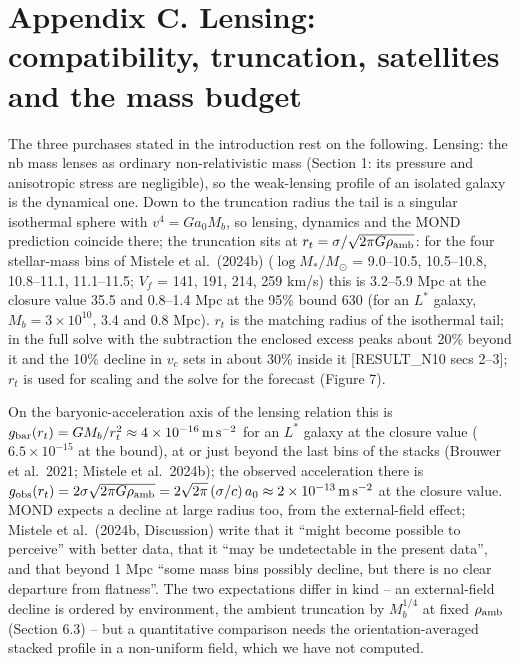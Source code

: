 \documentclass[
  10pt,
]{article}
\begin{document}
\section{Appendix C. Lensing: compatibility, truncation, satellites and the mass budget}\label{appendix-c.-lensing-compatibility-truncation-satellites-and-the-mass-budget}

The three purchases stated in the introduction rest on the following. Lensing: the nb mass lenses as ordinary non-relativistic mass (Section 1: its pressure and anisotropic stress are negligible), so the weak-lensing profile of an isolated galaxy is the dynamical one. Down to the truncation radius the tail is a singular isothermal sphere with $v^4=G a_0 M_b$, so lensing, dynamics and the MOND prediction coincide there; the truncation sits at $r_t=\sigma/\sqrt{2\pi G\rho_{\rm amb}}$: for the four stellar-mass bins of Mistele et al.~(2024b) ($\log M_*/M_\odot$ = 9.0--10.5, 10.5--10.8, 10.8--11.1, 11.1--11.5; $V_f$ = 141, 191, 214, 259 km/s) this is 3.2--5.9 Mpc at the closure value 35.5 and 0.8--1.4 Mpc at the 95\% bound 630 (for an $L^*$ galaxy, $M_b=3\times10^{10}$, 3.4 and 0.8 Mpc). $r_t$ is the matching radius of the isothermal tail; in the full solve with the subtraction the enclosed excess peaks about 20\% beyond it and the 10\% decline in $v_c$ sets in about 30\% inside it {[}RESULT\_N10 secs 2--3{]}; $r_t$ is used for scaling and the solve for the forecast (Figure 7).

On the baryonic-acceleration axis of the lensing relation this is $g_{\rm bar}(r_t)=GM_b/r_t^2\approx 4\times10^{-16}\,{\rm m\,s^{-2}}$ for an $L^*$ galaxy at the closure value ($6.5\times10^{-15}$ at the bound), at or just beyond the last bins of the stacks (Brouwer et al.~2021; Mistele et al.~2024b); the observed acceleration there is $g_{\rm obs}(r_t)=2\sigma\sqrt{2\pi G\rho_{\rm amb}}=2\sqrt{2\pi}\,(\sigma/c)\,a_0\approx 2\times10^{-13}\,{\rm m\,s^{-2}}$ at the closure value. MOND expects a decline at large radius too, from the external-field effect; Mistele et al.~(2024b, Discussion) write that it ``might become possible to perceive'' with better data, that it ``may be undetectable in the present data'', and that beyond 1 Mpc ``some mass bins possibly decline, but there is no clear departure from flatness''. The two expectations differ in kind -- an external-field decline is ordered by environment, the ambient truncation by $M_b^{1/4}$ at fixed $\rho_{\rm amb}$ (Section 6.3) -- but a quantitative comparison needs the orientation-averaged stacked profile in a non-uniform field, which we have not computed.
\end{document}

